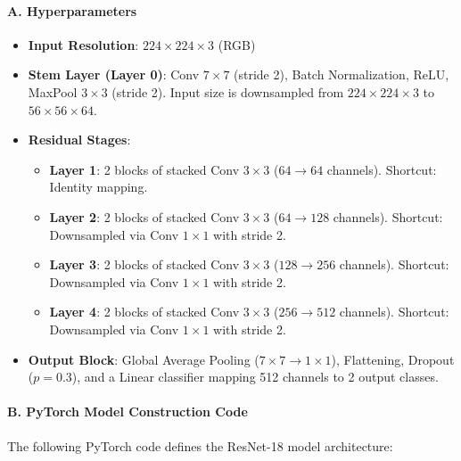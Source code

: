\documentclass[12pt,a4paper]{article}
\begin{document}
\paragraph{A. Hyperparameters}
\begin{itemize}
    \item \textbf{Input Resolution}: $224 \times 224 \times 3$ (RGB)
    \item \textbf{Stem Layer (Layer 0)}: Conv $7 \times 7$ (stride 2), Batch Normalization, ReLU, MaxPool $3 \times 3$ (stride 2). Input size is downsampled from $224 \times 224 \times 3$ to $56 \times 56 \times 64$.
    \item \textbf{Residual Stages}:
    \begin{itemize}
        \item \textbf{Layer 1}: 2 blocks of stacked Conv $3 \times 3$ ($64 \rightarrow 64$ channels). Shortcut: Identity mapping.
        \item \textbf{Layer 2}: 2 blocks of stacked Conv $3 \times 3$ ($64 \rightarrow 128$ channels). Shortcut: Downsampled via Conv $1 \times 1$ with stride 2.
        \item \textbf{Layer 3}: 2 blocks of stacked Conv $3 \times 3$ ($128 \rightarrow 256$ channels). Shortcut: Downsampled via Conv $1 \times 1$ with stride 2.
        \item \textbf{Layer 4}: 2 blocks of stacked Conv $3 \times 3$ ($256 \rightarrow 512$ channels). Shortcut: Downsampled via Conv $1 \times 1$ with stride 2.
    \end{itemize}
    \item \textbf{Output Block}: Global Average Pooling ($7 \times 7 \rightarrow 1 \times 1$), Flattening, Dropout ($p=0.3$), and a Linear classifier mapping 512 channels to 2 output classes.
\end{itemize}

\paragraph{B. PyTorch Model Construction Code}
The following PyTorch code defines the ResNet-18 model architecture:
\end{document}
